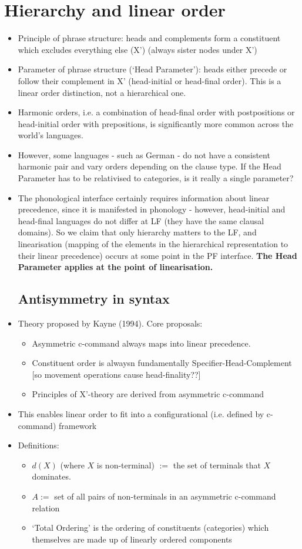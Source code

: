 \documentclass{article}
\begin{document}
\section{Hierarchy and linear order}
\begin{itemize}
    \item Principle of phrase structure: heads and complements form a constituent which excludes everything else (X') (always sister nodes under X')
    \item Parameter of phrase structure (`Head Parameter'): heads either precede or follow their complement in X' (head-initial or head-final order). This is a linear order distinction, not a hierarchical one.
    \item Harmonic orders, i.e. a combination of head-final order with postpositions or head-initial order with prepositions, is significantly more common across the world's languages.
    \item However, some languages - such as German - do not have a consistent harmonic pair and vary orders depending on the clause type. If the Head Parameter has to be relativised to categories, is it really a single parameter?
    \item The phonological interface certainly requires information about linear precedence, since it is manifested in phonology - however, head-initial and head-final languages do not differ at LF (they have the same clausal domains). So we claim that only hierarchy matters to the LF, and linearisation (mapping of the elements in the hierarchical representation to their linear precedence) occurs at some point in the PF interface. 
    \textbf{The Head Parameter applies at the point of linearisation.}
    \subsection{Antisymmetry in syntax}
    \item Theory proposed by Kayne (1994). Core proposals:
    \begin{itemize}
        \item Asymmetric c-command always maps into linear precedence.
        \item Constituent order is alwaysn fundamentally Specifier-Head-Complement [so movement operations cause head-finality??]
        \item Principles of X'-theory are derived from asymmetric c-command
    \end{itemize}
    \item This enables linear order to fit into a configurational (i.e. defined by c-command) framework
    \item Definitions:
    \begin{itemize}
        \item $d(X)$ (where $X$ is non-terminal) $:=$ the set of terminals that $X$ dominates.
        \item $A :=$ set of all pairs of non-terminals in an asymmetric c-command relation
        \item `Total Ordering' is the ordering of constituents (categories) which themselves are made up of linearly ordered components
    \end{itemize}

\end{itemize}
\end{document}
